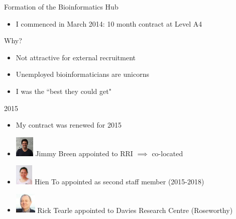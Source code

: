 \documentclass[11pt]{beamer}
\begin{document}
\begin{frame}{Formation of the Bioinformatics Hub}
	
	\begin{itemize}
		\item I commenced in March 2014: 10 month contract at Level A4
	\end{itemize}
	
	Why?

	\begin{itemize}
		\item Not attractive for external recruitment
		\item Unemployed bioinformaticians are unicorns
		\item I was the ``best they could get"\\[2cm]
	\end{itemize}
	
\end{frame}

\begin{frame}{2015}

	\begin{itemize}
		\item My contract was renewed for 2015
		\item \includegraphics[height=1cm]{figures/Jimmy.jpg} Jimmy Breen appointed to RRI $\implies$ co-located
		\item \includegraphics[height=1cm]{figures/hien.jpg} Hien To appointed as second staff member (2015-2018)
		\item \includegraphics[height=1cm]{figures/rick.jpeg} Rick Tearle appointed to Davies Research Centre (Roseworthy)\\[8mm]
	\end{itemize}		
	
\end{frame}
\end{document}
